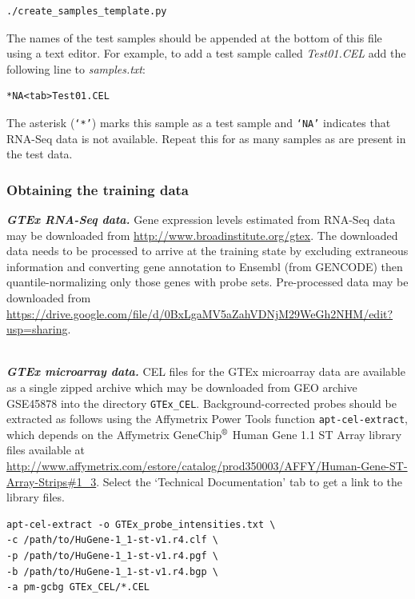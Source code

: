 \documentclass[a4paper,12pt]{article}
\begin{document}
\begin{verbatim}
./create_samples_template.py
\end{verbatim} 

The names of the test samples should be appended at the bottom of this file using a text editor. For example, to add a test sample called \textit{Test01.CEL} add the following line to \textit{samples.txt}:

\begin{verbatim}
*NA<tab>Test01.CEL
\end{verbatim}

The asterisk (\texttt{`*'}) marks this sample as a test sample and \texttt{`NA'} indicates that RNA-Seq data is not available. Repeat this for as many samples as are present in the test data.

\subsubsection{Obtaining the training data}

\textbf{\textit{GTEx RNA-Seq data.}} Gene expression levels estimated from RNA-Seq data may be downloaded from \url{http://www.broadinstitute.org/gtex}. The downloaded data needs to be processed to arrive at the training state by excluding extraneous information and converting gene annotation to Ensembl (from GENCODE) then quantile-normalizing only those genes with probe sets. Pre-processed data may be downloaded from \url{https://drive.google.com/file/d/0BxLgaMV5aZahVDNjM29WeGh2NHM/edit?usp=sharing}.

\noindent\\
\textbf{\textit{GTEx microarray data.}} CEL files for the GTEx microarray data are available as a single zipped archive which may be downloaded from GEO archive GSE45878 into the directory \texttt{GTEx\_CEL}. Background-corrected probes should be extracted as follows using the Affymetrix Power Tools function \texttt{apt-cel-extract}, which depends on the Affymetrix GeneChip$^{\text{\textregistered}}$ Human Gene 1.1 ST Array library files available at \url{http://www.affymetrix.com/estore/catalog/prod350003/AFFY/Human-Gene-ST-Array-Strips#1_3}. Select the `Technical Documentation' tab to get a link to the library files.

\begin{verbatim}
apt-cel-extract -o GTEx_probe_intensities.txt \
-c /path/to/HuGene-1_1-st-v1.r4.clf \
-p /path/to/HuGene-1_1-st-v1.r4.pgf \
-b /path/to/HuGene-1_1-st-v1.r4.bgp \
-a pm-gcbg GTEx_CEL/*.CEL
\end{verbatim}
\end{document}
